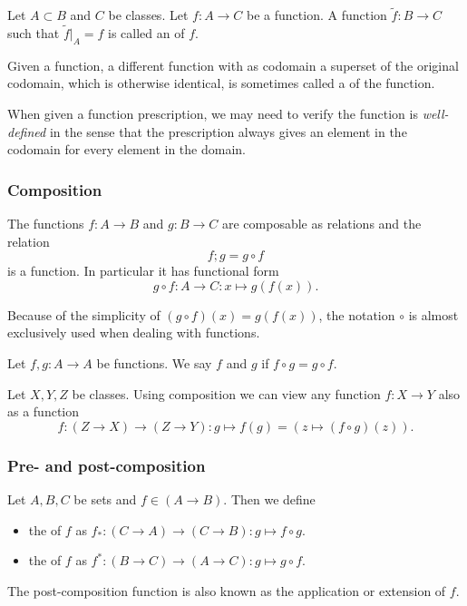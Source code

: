 \begin{definition}
Let $A\subset B$ and $C$ be classes. Let $f: A\to C$ be a function. A function $\tilde{f}: B\to C$ such that $\tilde{f}|_A = f$ is called an  of $f$.
\end{definition}
Given a function, a different function with as codomain a superset of the original codomain, which is otherwise identical, is sometimes called a  of the function.

When given a function prescription, we may need to verify the function is \emph{well-defined} in the sense that the prescription always gives an element in the codomain for every element in the domain.

\subsubsection{Composition}
\begin{lemma}
The functions $f:A\to B$ and $g:B\to C$ are composable as relations and the relation
\[ f;g = g\circ f \]
is a function. In particular it has functional form
\[ g\circ f: A\to C: x\mapsto g(f(x)). \]
\end{lemma}
Because of the simplicity of $(g\circ f)(x) = g(f(x))$, the notation $\circ$ is almost exclusively used when dealing with functions.

\begin{definition}
Let $f, g:A\to A$ be functions. We say $f$ and $g$  if $f\circ g = g\circ f$.
\end{definition}

\begin{note}
Let $X,Y,Z$ be classes. Using composition we can view any function $f: X\to Y$ also as a function
\[ f: (Z\to X)\to (Z\to Y): g\mapsto f(g) = (z\mapsto (f\circ g)(z)). \]
\end{note}

\subsubsection{Pre- and post-composition}
\begin{definition}
Let $A,B,C$ be sets and $f\in (A\to B)$. Then we define
\begin{itemize}
\item the  of $f$ as $f_*: (C\to A) \to (C\to B): g\mapsto f\circ g$.
\item the  of $f$ as $f^*: (B\to C) \to (A\to C): g\mapsto g\circ f$.
\end{itemize}
The post-composition function is also known as the  application or extension of $f$.
\end{definition}

